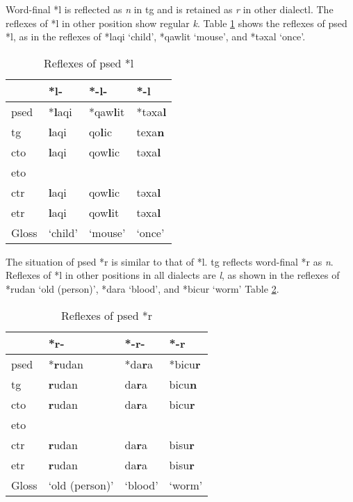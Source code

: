 
Word-final *l is reflected as \textit{n} in \acl{tg} and is retained as \textit{r} in other dialectl. The reflexes of *l in other position show regular \textit{k}. Table \ref{tab:psed_l} shows the reflexes of \acl{psed} *l, as in the reflexes of *laqi `child', *qawlit `mouse', and *təxal `once'. 

\begin{table}[!htbl]
\centering
\caption{Reflexes of \acl{psed} *l}
\label{tab:psed_l}
\begin{tabular}{llll}
\hline
           & *l-     & *-l-    & *-l    \\ \hline
\acs{psed} & *\textbf{l}aqi   & *qaw\textbf{l}it & *təxa\textbf{l} \\
\acs{tg}   & \textbf{l}aqi    & qo\textbf{l}ic   & texa\textbf{n}  \\
\acs{cto}  & \textbf{l}aqi    & qow\textbf{l}ic  & təxa\textbf{l}  \\
\acs{eto}  &         &         &        \\
\acs{ctr}  & \textbf{l}aqi    & qow\textbf{l}ic  & təxa\textbf{l}  \\
\acs{etr}  & \textbf{l}aqi    & qow\textbf{l}it  & təxa\textbf{l}  \\ \hline
Gloss      & `child' & `mouse' & `once' \\ \hline
\end{tabular}
\end{table}

The situation of \acl{psed} *r is similar to that of *l. \acl{tg} reflects word-final *r as \textit{n}. Reflexes of *l in other positions in all dialects are \textit{l}, as shown in the reflexes of *rudan `old (person)', *dara `blood', and *bicur `worm' Table \ref{tab:psed_r}. 

\begin{table}[!htbp]
\centering
\caption{Reflexes of \acl{psed} *r}
\label{tab:psed_r}
\begin{tabular}{llll}
\hline
           & *r-            & *-r-    & *-r    \\ \hline
\acs{psed} & *\textbf{r}udan         & *da\textbf{r}a   & *bicu\textbf{r} \\ \hdashline
\acs{tg}   & \textbf{r}udan          & da\textbf{r}a    & bicu\textbf{n}  \\
\acs{cto}  & \textbf{r}udan          & da\textbf{r}a    & bicu\textbf{r}  \\
\acs{eto}  &                &         &        \\
\acs{ctr}  & \textbf{r}udan          & da\textbf{r}a    & bisu\textbf{r}  \\
\acs{etr}  & \textbf{r}udan          & da\textbf{r}a    & bisu\textbf{r}  \\ \hline
Gloss      & `old (person)' & `blood' & `worm' \\ \hline
\end{tabular}
\end{table}

